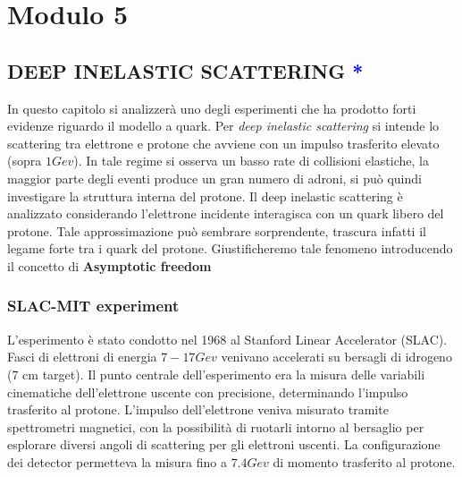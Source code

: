 \chapter{Modulo 5}\label{cap : Mod5}

\section{DEEP INELASTIC SCATTERING \textcolor{blue}{*}}

In questo capitolo si analizzerà uno degli esperimenti che ha prodotto forti evidenze riguardo il modello a quark. Per \textit{deep inelastic scattering} si intende lo scattering tra elettrone e protone che avviene con un impulso trasferito elevato (sopra $1 Gev$). In tale regime si osserva un basso rate di collisioni elastiche, la maggior parte degli eventi produce un gran numero di adroni, si può quindi investigare la struttura interna del protone. Il deep inelastic scattering è analizzato considerando l'elettrone incidente interagisca con un quark libero del protone. Tale approssimazione può sembrare sorprendente, trascura infatti il legame forte tra i quark del protone. Giustificheremo tale fenomeno introducendo il concetto di \textbf{Asymptotic freedom} 

\subsection{SLAC-MIT experiment}

L'esperimento è stato condotto nel 1968 al Stanford Linear Accelerator (SLAC). Fasci di elettroni di energia $7-17 Gev$ venivano accelerati su bersagli di idrogeno (7 cm target). Il punto centrale dell'esperimento era la misura delle variabili cinematiche dell'elettrone uscente con precisione, determinando l'impulso trasferito al protone. L'impulso dell'elettrone veniva misurato tramite spettrometri magnetici, con la possibilità di ruotarli intorno al bersaglio per esplorare diversi angoli di scattering per gli elettroni uscenti. La configurazione dei detector permetteva la misura fino a $7.4 Gev$ di momento trasferito al protone.

